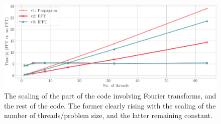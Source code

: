 \documentclass{article}
\begin{document}
\begin{figure}
    \centering
    \includegraphics[width=\textwidth]{./figures/FFT_scaling.pdf}
    \caption{The scaling of the part of the code involving Fourier transforms, and the rest of the code. The former clearly rising with the scaling of the number of threads/problem size, and the latter remaining constant.}
    \label{fig:fft_scaling}
\end{figure}

\appendix
\end{document}
